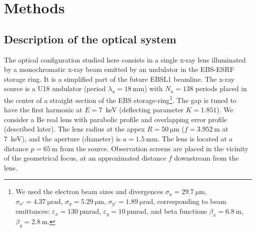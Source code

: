 \documentclass{iucr}
\begin{document}
\section{Methods}\label{sec:methods}

\subsection{Description of the optical system}\label{sec:descriptionsystem}

The optical configuration studied here consists in a single x-ray lens illuminated by a monochromatic x-ray beam emitted by an undulator in the EBS-ESRF storage ring. It is a simplified part of the future EBSL1 beamline.
The x-ray source is a U18 undulator (period $\lambda_u=\SI{18}{\milli\meter}$) with $N_u=138$ periods placed in the center of a straight section of the EBS storage-ring\footnote{We used the electron beam sizes and divergences $\sigma_x=\SI{29.7}{\micro\meter}$,
$\sigma_{x'}=\SI{4.37}{\micro\radian}$,
$\sigma_y=\SI{5.29}{\micro\meter}$,
$\sigma_{y'}=\SI{1.89}{\micro\radian}$, corresponding to beam emittances:  $\varepsilon_x=\SI{130}{\pico\meter \radian}$,
$\varepsilon_y=\SI{10}{\pico\meter \radian}$, and beta functions
$\beta_x=\SI{6.8}{\meter}$,
$\beta_y=\SI{2.8}{\meter}$.
}. The gap is tuned to have the first harmonic at $E=7$~keV (deflecting parameter $K=1.851$). We consider a Be real lens with parabolic profile and overlapping error profile (described later). The lens radius at the appex $R=\SI{50}{\micro\meter}$ ($f=\SI{3.952}{\meter}$ at 7~keV), 
 and the aperture (diameter) is $a=\SI{1.5}{\milli\meter}$. The lens is located at a distance $p=\SI{65}{\meter}$ from the source. Observation screens are placed in the vicinity of the geometrical focus, at an approximated distance $f$ downstream from the lens. 
\end{document}

